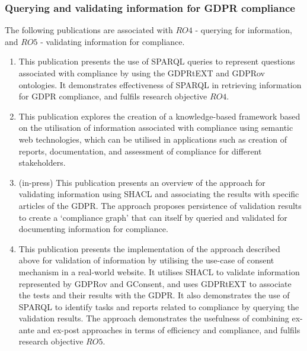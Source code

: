 \subsubsection{Querying and validating information for GDPR compliance}
The following publications are associated with $RO4$ - querying for information, and $RO5$ - validating information for compliance.
\begin{enumerate}[resume]
    \item \textbf{}
        \newline
        This publication presents the use of SPARQL queries to represent questions associated with compliance by using the GDPRtEXT and GDPRov ontologies.
        It demonstrates effectiveness of SPARQL in retrieving information for GDPR compliance, and fulfils research objective $RO4$.
    \item \textbf{}
        \newline This publication explores the creation of a knowledge-based framework based on the utilisation of information associated with compliance using semantic web technologies, which can be utilised in applications such as creation of reports, documentation, and assessment of compliance for different stakeholders.
    \item \textbf{} (in-press)
        \newline
        This publication presents an overview of the approach for validating information using SHACL and associating the results with specific articles of the GDPR. The approach proposes persistence of validation results to create a `compliance graph' that can itself by queried and validated for documenting information for compliance.
    \item \textbf{}
        \newline
        This publication presents the implementation of the approach described above for validation of information by utilising the use-case of consent mechanism in a real-world website. It utilises SHACL to validate information represented by GDPRov and GConsent, and uses GDPRtEXT to associate the tests and their results with the GDPR. It also demonstrates the use of SPARQL to identify tasks and reports related to compliance by querying the validation results. The approach demonstrates the usefulness of combining ex-ante and ex-post approaches in terms of efficiency and compliance, and fulfils research objective $RO5$.
\end{enumerate}

